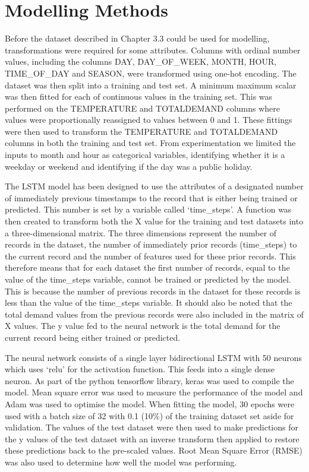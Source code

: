 \documentclass[mstat,12pt]{unswthesis}
\begin{document}
\bigskip

\hypertarget{modelling-methods}{%
\section{Modelling Methods}\label{modelling-methods}}

Before the dataset described in Chapter 3.3 could be used for modelling,
transformations were required for some attributes. Columns with ordinal
number values, including the columns DAY, DAY\_OF\_WEEK, MONTH, HOUR,
TIME\_OF\_DAY and SEASON, were transformed using one-hot encoding. The
dataset was then split into a training and test set. A minimum maximum
scalar was then fitted for each of continuous values in the training
set. This was performed on the TEMPERATURE and TOTALDEMAND columns where
values were proportionally reassigned to values between 0 and 1. These
fittings were then used to transform the TEMPERATURE and TOTALDEMAND
columns in both the training and test set. From experimentation we
limited the inputs to month and hour as categorical variables,
identifying whether it is a weekday or weekend and identifying if the
day was a public holiday.

\bigskip

The LSTM model has been designed to use the attributes of a designated
number of immediately previous timestamps to the record that is either
being trained or predicted. This number is set by a variable called
`time\_steps'. A function was then created to transform both the X value
for the training and test datasets into a three-dimensional matrix. The
three dimensions represent the number of records in the dataset, the
number of immediately prior records (time\_steps) to the current record
and the number of features used for these prior records. This therefore
means that for each dataset the first number of records, equal to the
value of the time\_steps variable, cannot be trained or predicted by the
model. This is because the number of previous records in the dataset for
these records is less than the value of the time\_steps variable. It
should also be noted that the total demand values from the previous
records were also included in the matrix of X values. The y value fed to
the neural network is the total demand for the current record being
either trained or predicted.

\bigskip

The neural network consists of a single layer bidirectional LSTM with 50
neurons which uses `relu' for the activation function. This feeds into a
single dense neuron. As part of the python tensorflow library, keras was
used to compile the model. Mean square error was used to measure the
performance of the model and Adam was used to optimise the model. When
fitting the model, 30 epochs were used with a batch size of 32 with 0.1
(10\%) of the training dataset set aside for validation. The values of
the test dataset were then used to make predictions for the y values of
the test dataset with an inverse transform then applied to restore these
predictions back to the pre-scaled values. Root Mean Square Error (RMSE)
was also used to determine how well the model was performing.
\end{document}
